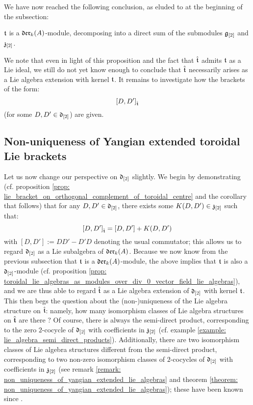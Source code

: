         We have now reached the following conclusion, as eluded to at the beginning of the subsection:
        \begin{proposition} \label{prop: toroidal_lie_algebras_as_modules_over_vector_field_lie_algebras}
            $\mathfrak{t}$ is a $\mathfrak{der}_{k}(A)$-module, decomposing into a direct sum of the submodules $\mathfrak{g}_{[2]}$ and $\mathfrak{z}_{[2]}$. 
        \end{proposition}
        We note that even in light of this proposition and the fact that $\hat{\mathfrak{t}}$ admits $\mathfrak{t}$ as a Lie ideal, we still do not yet know enough to conclude that $\hat{\mathfrak{t}}$ necessarily arises as a Lie algebra extension with kernel $\mathfrak{t}$. It remains to investigate how the brackets of the form:
            $$[D, D']_{\hat{\mathfrak{t}}}$$
        (for some $D, D' \in \mathfrak{d}_{[2]}$) are given.

    \subsection{Non-uniqueness of Yangian extended toroidal Lie brackets}
        Let us now change our perspective on $\mathfrak{d}_{[2]}$ slightly. We begin by demonstrating (cf. proposition \ref{prop: lie_bracket_on_orthogonal_complement_of_toroidal_centre} and the corollary that follows) that for any $D, D' \in \mathfrak{d}_{[2]}$, there exists some $K(D, D') \in \mathfrak{z}_{[2]}$ such that:
            $$[D, D']_{\hat{\mathfrak{t}}} = [D, D'] + K(D, D')$$
        with $[D, D'] := DD' - D'D$ denoting the usual commutator; this allows us to regard $\mathfrak{d}_{[2]}$ as a Lie subalgebra of $\mathfrak{der}_k(A)$. Because we now know from the previous subsection that $\mathfrak{t}$ is a $\mathfrak{der}_k(A)$-module, the above implies that $\mathfrak{t}$ is also a $\mathfrak{d}_{[2]}$-module (cf. proposition \ref{prop: toroidal_lie_algebras_as_modules_over_div_0_vector_field_lie_algebras}), and we are thus able to regard $\hat{\mathfrak{t}}$ as a Lie algebra extension of $\mathfrak{d}_{[2]}$ with kernel $\mathfrak{t}$. This then begs the question about the (non-)uniqueness of the Lie algebra structure on $\hat{\mathfrak{t}}$: namely, how many isomorphism classes of Lie algebra structures on $\hat{\mathfrak{t}}$ are there ? Of course, there is always the semi-direct product, corresponding to the zero $2$-cocycle of $\mathfrak{d}_{[2]}$ with coefficients in $\mathfrak{z}_{[2]}$ (cf. example \ref{example: lie_algebra_semi_direct_products}). Additionally, there are two isomorphism classes of Lie algebra structures different from the semi-direct product, corresponding to two non-zero isomorphism classes of $2$-cocycles of $\mathfrak{d}_{[2]}$ with coefficients in $\mathfrak{z}_{[2]}$ (see remark \ref{remark: non_uniqueness_of_yangian_extended_lie_algebras} and theorem \ref{theorem: non_uniqueness_of_yangian_extended_lie_algebras}); these have been known since \cite{billig_energy_momentum_tensor}. 
        
